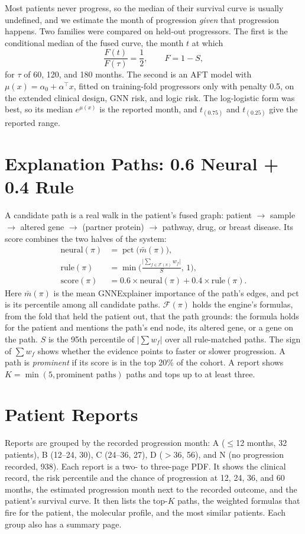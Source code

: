 \documentclass{mnnit}
\begin{document}
Most patients never progress, so the median of their survival curve is usually undefined, and we estimate the month of
progression \emph{given} that progression happens. Two families were compared on held-out progressors. The first is the
conditional median of the fused curve, the month $t$ at which
\begin{equation}
  \frac{F(t)}{F(\tau)}=\frac12, \qquad F=1-S,
\end{equation}
for $\tau$ of 60, 120, and 180 months. The second is an AFT model with $\mu(x)=\alpha_0+\alpha^\top x$, fitted on
training-fold progressors only with penalty 0.5, on the extended clinical design, GNN risk, and logic risk. The
log-logistic form was best, so its median $e^{\mu(x)}$ is the reported month, and $t_{(0.75)}$ and $t_{(0.25)}$ give the
reported range.

\section{Explanation Paths: 0.6 Neural + 0.4 Rule}
A candidate path is a real walk in the patient's fused graph: patient $\rightarrow$ sample $\rightarrow$ altered gene
$\rightarrow$ (partner protein) $\rightarrow$ pathway, drug, or breast disease. Its score combines the two halves of
the system:
\begin{align}
  \text{neural}(\pi)&=\operatorname{pct}\big(\bar m(\pi)\big), \\
  \text{rule}(\pi)&=\min\Big(\frac{\big|\sum_{f\in\mathcal{F}(\pi)}w_f\big|}{S},\,1\Big), \\
  \text{score}(\pi)&=0.6\times\text{neural}(\pi)+0.4\times\text{rule}(\pi).
\end{align}
Here $\bar m(\pi)$ is the mean GNNExplainer importance of the path's edges, and pct is its percentile among all candidate
paths. $\mathcal{F}(\pi)$ holds the engine's formulas, from the fold that held the patient out, that the path grounds: the
formula holds for the patient and mentions the path's end node, its altered gene, or a gene on the path. $S$ is the 95th
percentile of $|\sum w_f|$ over all rule-matched paths. The sign of $\sum w_f$ shows whether the evidence points to faster
or slower progression. A path is \emph{prominent} if its score is in the top 20\% of the cohort. A report shows
$K = \min(5, \text{prominent paths})$ paths and tops up to at least three.

\section{Patient Reports}
Reports are grouped by the recorded progression month: A ($\le$12 months, 32 patients), B (12--24, 30), C (24--36, 27),
D ($>$36, 56), and N (no progression recorded, 938). Each report is a two- to three-page PDF. It shows the
clinical record, the risk percentile and the chance of progression at 12, 24, 36, and 60 months, the estimated
progression month next to the recorded outcome, and the patient's survival curve. It then lists the top-$K$ paths, the
weighted formulas that fire for the patient, the molecular profile, and the most similar patients. Each group also has
a summary page.
\end{document}
